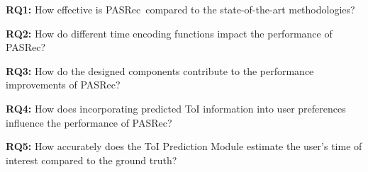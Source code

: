 \documentclass[sigconf,nonacm]{acmart}
\newcommand{\modelname}{PASRec}
\begin{document}
\textbf{RQ1:} 
How effective is \modelname\ compared to the state-of-the-art methodologies?

\textbf{RQ2:} 
How do different time encoding functions impact the performance of \modelname? 

\textbf{RQ3:} 
How do the designed components contribute to the performance improvements of \modelname?

\textbf{RQ4:} 
How does incorporating predicted ToI information into user preferences influence the performance of \modelname?

\textbf{RQ5:} 
How accurately does the ToI Prediction Module estimate the user's time of interest compared to the ground truth?

\begin{table}[t]
\caption{Statistics of Datasets}
\label{tab:Statical}
\centering
{}
\end{table}
\end{document}
